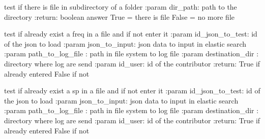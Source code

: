 \documentclass[letterpaper,10pt,english]{sphinxmanual}
\begin{document}

\begin{fulllineitems}
\label{\detokenize{QuChemPedIA.QuChemPedIA_lib:QuChemPedIA.QuChemPedIA_lib.import_file_lib.does_file_exist_in_dir}}
test if there is file in subdirectory of a folder
:param dir\_path: path to the directory
:return: boolean answer True = there is file False = no more file

\end{fulllineitems}


\begin{fulllineitems}
\label{\detokenize{QuChemPedIA.QuChemPedIA_lib:QuChemPedIA.QuChemPedIA_lib.import_file_lib.exist_freq}}
test if already exist a freq in a file and if not enter it
:param id\_json\_to\_test: id of the json to load
:param json\_to\_input: json data to input in elastic search
:param path\_to\_log\_file : path in file system to log file
:param destination\_dir : directory where log are send
:param id\_user: id of the contributor
:return: True if already entered False if not

\end{fulllineitems}


\begin{fulllineitems}
\label{\detokenize{QuChemPedIA.QuChemPedIA_lib:QuChemPedIA.QuChemPedIA_lib.import_file_lib.exist_sp}}
test if already exist a sp in a file and if not enter it
:param id\_json\_to\_test: id of the json to load
:param json\_to\_input: json data to input in elastic search
:param path\_to\_log\_file : path in file system to log file
:param destination\_dir : directory where log are send
:param id\_user: id of the contributor
:return: True if already entered False if not

\end{fulllineitems}
\end{document}
